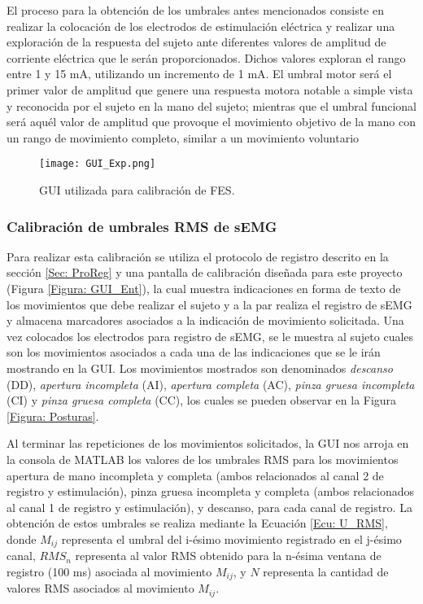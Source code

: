 El proceso para la obtención de los umbrales antes mencionados consiste en realizar la colocación de los electrodos de estimulación eléctrica y realizar una exploración de la respuesta del sujeto ante diferentes valores de amplitud de corriente eléctrica que le serán proporcionados. Dichos valores exploran el rango entre 1 y 15 mA, utilizando un incremento de 1 mA. El umbral motor será el primer valor de amplitud que genere una respuesta motora notable a simple vista y reconocida por el sujeto en la mano del sujeto; mientras que el umbral funcional será aquél valor de amplitud que provoque el movimiento objetivo de la mano con un rango de movimiento completo, similar a un movimiento voluntario

\begin{figure}[htb]
	\centering
	\texttt{[image: GUI\_Exp.png]}
	\caption{GUI utilizada para calibración de FES.}
	\label{Figura: GUI_Exp}
\end{figure}

\subsubsection{Calibración de umbrales RMS de sEMG}
Para realizar esta calibración se utiliza el protocolo de registro descrito en la sección \ref{Sec: ProReg} y una pantalla de calibración diseñada para este proyecto (Figura \ref{Figura: GUI_Ent}), la cual muestra indicaciones en forma de texto de los movimientos que debe realizar el sujeto y a la par realiza el registro de sEMG y almacena marcadores asociados a la indicación de movimiento solicitada. Una vez colocados los electrodos para registro de sEMG, se le muestra al sujeto cuales son los movimientos asociados a cada una de las indicaciones que se le irán mostrando en la GUI. Los movimientos mostrados son denominados \emph{descanso} (DD), \emph{apertura incompleta} (AI), \emph{apertura completa} (AC), \emph{pinza gruesa incompleta} (CI) y \emph{pinza gruesa completa} (CC), los cuales se pueden observar en la Figura \ref{Figura: Posturas}.

Al terminar las repeticiones de los movimientos solicitados, la GUI nos arroja en la consola de MATLAB\textregistered \; los valores de los umbrales RMS para los movimientos apertura de mano incompleta y completa (ambos relacionados al canal 2 de registro y estimulación), pinza gruesa incompleta y completa (ambos relacionados al canal 1 de registro y estimulación), y descanso, para cada canal de registro. La obtención de estos umbrales se realiza mediante la Ecuación \ref{Ecu: U_RMS}, donde $M_{ij}$ representa el umbral del i-ésimo movimiento registrado en el j-ésimo canal, $RMS_n$ representa al valor RMS obtenido para la n-ésima ventana de registro (100 ms) asociada al movimiento $M_{ij}$, y $N$ representa la cantidad de valores RMS asociados al movimiento $M_{ij}$.


